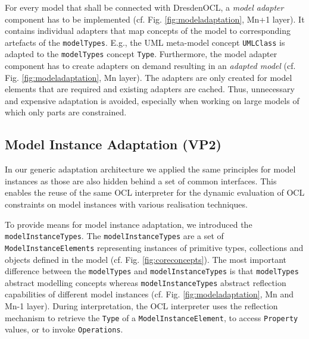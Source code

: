 	For every model that shall be connected with DresdenOCL, 
	a \emph{model adapter} component has to be implemented (cf. Fig. \ref{fig:modeladaptation}, Mn+1 layer). 
	It contains individual adapters that map concepts of the model to corresponding artefacts of the \texttt{modelTypes}. E.g., the UML
	meta-model concept \texttt{UMLClass} is adapted to the \texttt{modelTypes} concept
	\texttt{Type}. 
	Furthermore, the model adapter component has to create 
	adapters on demand resulting in an \textit{adapted model} (cf. Fig.
	\ref{fig:modeladaptation}, Mn layer).
	The adapters are only created for model elements that are required and
	existing adapters are cached. Thus, unnecessary and expensive adaptation is avoided, 
	especially when working on large models of which only parts are constrained.


\subsection{Model Instance Adaptation (VP2)}
	
	In our generic adaptation architecture we applied the same principles for model instances as those are also hidden behind a set of common
	interfaces. This enables the reuse of the same OCL interpreter for the dynamic
	evaluation of OCL constraints on model instances with various realisation techniques.
	
	To provide means for model instance adaptation, we introduced the
	\texttt{model\-Instance\-Types}. The \texttt{modelInstanceTypes} are a set of \texttt{ModelInstanceElements}
	representing instances of primitive types, 
	collections and objects defined in the model (cf. Fig. \ref{fig:coreconcepts}). 
  The most important difference between the \texttt{modelTypes} and \texttt{modelInstanceTypes}
	is that \texttt{modelTypes} abstract modelling concepts whereas \texttt{modelInstanceTypes} abstract 
	reflection capabilities of different model instances (cf. Fig. \ref{fig:modeladaptation}, Mn and Mn-1 layer).
	During interpretation, the OCL interpreter uses the reflection mechanism to
	retrieve the \texttt{Type} of a \texttt{ModelInstanceElement}, to access \texttt{Property}
	values, or to invoke \texttt{Operations}.
	
